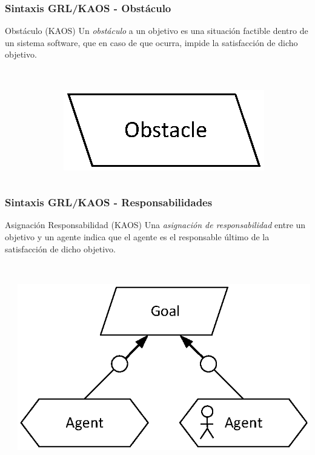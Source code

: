 \documentclass[handout,slidestop,xcolor=pst,dvips,blue]{beamer}
\begin{document}
\begin{frame}[c]
    \frametitle{Sintaxis GRL/KAOS - Obstáculo}
    \begin{block}{Obstáculo (KAOS)}
        Un \alert{\emph{obstáculo}}  a un objetivo es una situación factible dentro de un sistema software, que en caso de que ocurra, impide la satisfacción de dicho objetivo.
        \ \\
        \ \\
        \begin{columns}[c]
            \begin{column}{0.50\linewidth}
            \end{column}
            \begin{column}{0.50\linewidth}
                \centering \includegraphics[width=0.50\columnwidth,keepaspectratio=true]{images/objetivos/obstacle(KAOS).eps}
            \end{column}
        \end{columns}
     \end{block}
\end{frame}

\begin{frame}[c]
    \frametitle{Sintaxis GRL/KAOS - Responsabilidades}
    \begin{block}{Asignación Responsabilidad (KAOS)}
        Una \alert{\emph{asignación de responsabilidad}} entre un objetivo y un agente indica que el agente es el responsable último de la satisfacción de dicho objetivo.
        \ \\
        \ \\
        \begin{columns}[c]
            \begin{column}{0.50\linewidth}
            \end{column}
            \begin{column}{0.50\linewidth}
                \centering \includegraphics[width=0.65\columnwidth,keepaspectratio=true]{images/objetivos/responsabilityAsig(KAOS).eps}
            \end{column}
        \end{columns}
    \end{block}
\end{frame}
\end{document}
